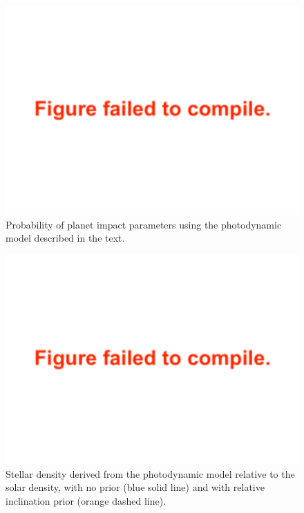\documentclass[twocolumn]{aastex63}
\begin{document}
\begin{figure}
    \centering
    \includegraphics[width=\hsize]{figures/impact_parameter_noprior.pdf}
    {Probability of planet impact parameters using the photodynamic model described in the text.}
    \label{fig:impact_parameter}
\end{figure}

\begin{figure}
    \centering
    \includegraphics[width=\hsize]{figures/stellar_density_noprior.pdf}
    {Stellar density derived from the photodynamic model relative to the solar density, with no prior (blue solid line) and with relative inclination prior (orange dashed line).}
    \label{fig:stellar_density}
\end{figure}
\end{document}
